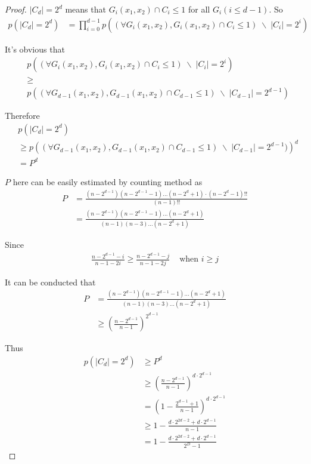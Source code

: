 \documentclass[10pt,a4paper]{article}
\begin{document}
		\begin{proof}
			$|C_d| = 2^d$ means that $G_i(x_1, x_2) \cap C_i \leq 1$
			for all $G_i(i \leq d-1)$. So
			\begin{align*}
				p(|C_d| = 2^d) &= \prod_{i=0}^{d-1} p\left((\forall G_i(x_1, x_2), G_i(x_1, x_2) \cap C_i \leq 1)
					 \; \backslash \; |C_i| = 2^i\right)
			\end{align*}
			
			It's obvious that
			\begin{align*}
			&p\left((\forall G_i(x_1, x_2), G_i(x_1, x_2) \cap C_i \leq 1) \; \backslash \; |C_i| = 2^i\right)\\
			&\geq \\
			&p\left((\forall G_{d-1}(x_1, x_2), G_{d-1}(x_1, x_2) \cap C_{d-1} \leq 1) \; \backslash \; 
				|C_{d-1}| = 2^{d-1}\right)
			\end{align*}
			
			Therefore
			\begin{align*}
				&p(|C_d| = 2^d) \\
				&\geq p\left((\forall G_{d-1}(x_1, x_2), G_{d-1}(x_1, x_2) 
					\cap C_{d-1} \leq 1) \; \backslash \; |C_{d-1}| = 2^{d-1})\right)^d\\
				&= P^d
			\end{align*}
			
			$P$ here can be easily estimated by counting method as
			\begin{align*}
				P &= \frac{(n-2^{d-1})(n-2^{d-1}-1)\ldots(n-2^d+1)\cdot (n-2^d-1)!!}{(n-1)!!}\\
					&= \frac{(n-2^{d-1})(n-2^{d-1}-1)\ldots (n-2^d+1)}{(n-1)(n-3)\ldots(n-2^d+1)}
			\end{align*}
			
			Since
			\begin{align*}
				\frac{n-2^{d-1}-i}{n-1-2i} \geq \frac{n-2^{d-1}-j}{n-1-2j} & \text{ when } i \geq j
			\end{align*}
			
			It can be conducted that
			\begin{align*}
				P &= \frac{(n-2^{d-1})(n-2^{d-1}-1)\ldots (n-2^d+1)}{(n-1)(n-3)\ldots(n-2^d+1)}\\
					&\geq (\frac{n-2^{d-1}}{n-1})^{2^{d-1}}
			\end{align*}
			
			Thus
			\begin{align*}
			p(|C_d| = 2^d) &\geq P^d\\
				&\geq (\frac{n-2^{d-1}}{n-1})^{d \cdot 2^{d-1}}\\
				&= (1-\frac{2^{d-1}+1}{n-1})^{d \cdot 2^{d-1}}\\
				&\geq 1-\frac{d \cdot 2^{2d-2}+d \cdot 2^{d-1}}{n-1}\\
				&= 1-\frac{d \cdot 2^{2d-2}+d \cdot 2^{d-1}}{2^D-1}
			\end{align*}
		\end{proof}
		
\end{document}
